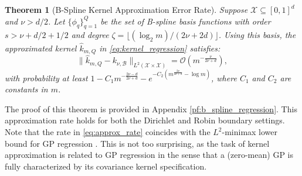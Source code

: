 \documentclass[aos,preprint]{imsart}
\theoremstyle{plain}
\newtheorem{theorem}{Theorem}[section]
\newcommand{\CalO}{\mathcal O}
\newcommand{\CalX}{\mathcal X}
\newcommand{\BFx}{\bold x}
\theoremstyle{remark}
\begin{document}
\begin{theorem}[B-Spline Kernel Approximation Error Rate]
\label{thm:b_spline_regression}
Suppose $\CalX\subseteq[0,1]^d$ and $\nu > d/2$. Let $\{\phi_q\}_{q=1}^Q$ be the set of B-spline basis functions with order $s>\nu+d/2+1/2$ and degree $\zeta = \lfloor (\log_2m)/(2\nu+2d) \rfloor$. Using this basis, the approximated kernel $\hat{k}_{m,Q}$ in \eqref{eq:kernel_regression} satisfies:
\begin{equation}
    \|\hat{k}_{m,Q}-k_{\nu,\mathcal{B}}\|_{L^2(\CalX\times\CalX)}= \CalO(m^{-\frac{\nu}{2\nu+d}}),
    \label{eq:approx_rate}
\end{equation}
     with probability at least $1-C_1m^{-\frac{2\nu-d}{2\nu+d}}-e^{-C_2(m^{\frac{2\nu}{2\nu+d}}-\log m)}$, where $C_1$ and $C_2$ are constants in $m$.
 \end{theorem}
\noindent The proof of this theorem is provided in Appendix \ref{pf:b_spline_regression}. This approximation rate holds for both the Dirichlet and Robin boundary settings. Note that the rate in \eqref{eq:approx_rate} coincides with the $L^2$-minimax lower bound for GP regression \citep[Theorem 10]{wang2022gaussian}. This is not too surprising, as the task of kernel approximation is related to GP regression in the sense that a (zero-mean) GP is fully characterized by its covariance kernel specification.
\end{document}
